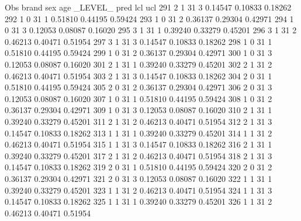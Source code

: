 \documentclass{article}
\begin{document}
\begin{Woutput}
 Obs    brand    sex    age    _LEVEL_      pred       lcl        ucl
 291      2       1      31       3       0.14547    0.10833    0.18262
 292      1       0      31       1       0.51810    0.44195    0.59424
 293      1       0      31       2       0.36137    0.29304    0.42971
 294      1       0      31       3       0.12053    0.08087    0.16020
 295      3       1      31       1       0.39240    0.33279    0.45201
 296      3       1      31       2       0.46213    0.40471    0.51954
 297      3       1      31       3       0.14547    0.10833    0.18262
 298      1       0      31       1       0.51810    0.44195    0.59424
 299      1       0      31       2       0.36137    0.29304    0.42971
 300      1       0      31       3       0.12053    0.08087    0.16020
 301      2       1      31       1       0.39240    0.33279    0.45201
 302      2       1      31       2       0.46213    0.40471    0.51954
 303      2       1      31       3       0.14547    0.10833    0.18262
 304      2       0      31       1       0.51810    0.44195    0.59424
 305      2       0      31       2       0.36137    0.29304    0.42971
 306      2       0      31       3       0.12053    0.08087    0.16020
 307      1       0      31       1       0.51810    0.44195    0.59424
 308      1       0      31       2       0.36137    0.29304    0.42971
 309      1       0      31       3       0.12053    0.08087    0.16020
 310      2       1      31       1       0.39240    0.33279    0.45201
 311      2       1      31       2       0.46213    0.40471    0.51954
 312      2       1      31       3       0.14547    0.10833    0.18262
 313      1       1      31       1       0.39240    0.33279    0.45201
 314      1       1      31       2       0.46213    0.40471    0.51954
 315      1       1      31       3       0.14547    0.10833    0.18262
 316      2       1      31       1       0.39240    0.33279    0.45201
 317      2       1      31       2       0.46213    0.40471    0.51954
 318      2       1      31       3       0.14547    0.10833    0.18262
 319      2       0      31       1       0.51810    0.44195    0.59424
 320      2       0      31       2       0.36137    0.29304    0.42971
 321      2       0      31       3       0.12053    0.08087    0.16020
 322      1       1      31       1       0.39240    0.33279    0.45201
 323      1       1      31       2       0.46213    0.40471    0.51954
 324      1       1      31       3       0.14547    0.10833    0.18262
 325      1       1      31       1       0.39240    0.33279    0.45201
 326      1       1      31       2       0.46213    0.40471    0.51954

\end{Woutput}
\end{document}
